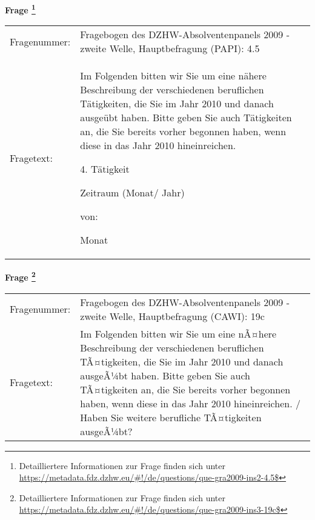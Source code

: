 				\vspace*{0.5cm}
                \noindent\textbf{Frage
	                \footnote{Detailliertere Informationen zur Frage finden sich unter
		              \url{https://metadata.fdz.dzhw.eu/\#!/de/questions/que-gra2009-ins2-4.5$}}}\\
				\begin{tabularx}{\hsize}{@{}lX}
					Fragenummer: &
					  Fragebogen des DZHW-Absolventenpanels 2009 - zweite Welle, Hauptbefragung (PAPI):
					  4.5
 \\
					Fragetext: & Im Folgenden bitten wir Sie um eine nähere Beschreibung der verschiedenen beruflichen Tätigkeiten, die Sie im Jahr 2010 und danach ausgeübt haben. Bitte geben Sie auch Tätigkeiten an, die Sie bereits vorher begonnen haben, wenn diese in das Jahr 2010 hineinreichen.\par  4. Tätigkeit\par  Zeitraum (Monat/ Jahr)\par  von:\par  Monat \\
				\end{tabularx}
				\vspace*{0.5cm}
                \noindent\textbf{Frage
	                \footnote{Detailliertere Informationen zur Frage finden sich unter
		              \url{https://metadata.fdz.dzhw.eu/\#!/de/questions/que-gra2009-ins3-19c$}}}\\
				\begin{tabularx}{\hsize}{@{}lX}
					Fragenummer: &
					  Fragebogen des DZHW-Absolventenpanels 2009 - zweite Welle, Hauptbefragung (CAWI):
					  19c
 \\
					Fragetext: & Im Folgenden bitten wir Sie um eine nÃ¤here Beschreibung der verschiedenen beruflichen TÃ¤tigkeiten, die Sie im Jahr 2010 und danach ausgeÃ¼bt haben. Bitte geben Sie auch TÃ¤tigkeiten an, die Sie bereits vorher begonnen haben, wenn diese in das Jahr 2010 hineinreichen. / Haben Sie weitere berufliche TÃ¤tigkeiten ausgeÃ¼bt? \\
				\end{tabularx}





